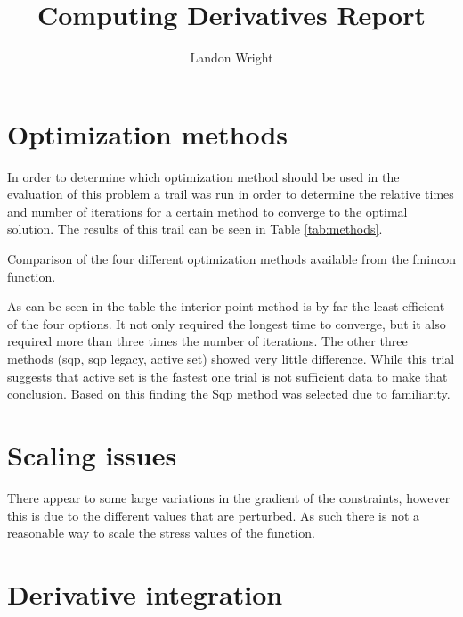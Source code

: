 \documentclass{article}
\begin{document}
\singlespacing
\title{Computing Derivatives Report}
\author{Landon Wright}
\maketitle

\section{Optimization methods}
In order to determine which optimization method should be used in the evaluation of this problem a trail was run in order to determine the relative times and number of iterations for a certain method to converge to the optimal solution.  The results of this trail can be seen in Table \ref{tab:methods}.
\begin{table}[h]
	\begin{center}
		\caption{Comparison of the four different optimization methods available from the fmincon function.}
		\label{tab:methods}
		\noindent{}
	\end{center}
\end{table}

As can be seen in the table the interior point method is by far the least efficient of the four options. It not only required the longest time to converge, but it also required more than three times the number of iterations.  The other three methods (sqp, sqp legacy, active set) showed very little difference.  While this trial suggests that active set is the fastest one trial is not sufficient data to make that conclusion.  Based on this finding the Sqp method was selected due to familiarity.


\section{Scaling issues}
There appear to some large variations in the gradient of the constraints, however this is due to the different values that are perturbed.  As such there is not a reasonable way to scale the stress values of the function.

\section{Derivative integration}
\end{document}
